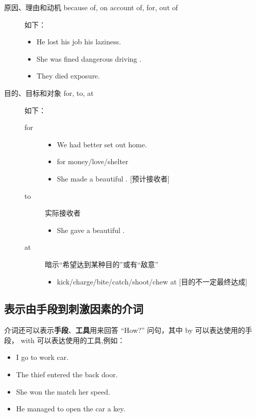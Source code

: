 \begin{description}
\item[原因、理由和动机 because of, on account of, for, out of] 如下：
  \begin{itemize}
  \item He lost his job  his laziness.
  \item She was fined  dangerous driving .
  \item They died  exposure.
  \end{itemize}

\item[目的、目标和对象 for, to, at] 如下：
  \begin{description}

  \item[for]
    \begin{itemize}
    \item We had better set out  home.

    \item for money/love/shelter

    \item She made a beautiful . [预计接收者]
    \end{itemize}

  \item[to] 实际接收者
    \begin{itemize}
    \item She gave a beautiful .
    \end{itemize}

  \item[at] 暗示“希望达到某种目的”或有“敌意”
    \begin{itemize}
    \item kick/charge/bite/catch/shoot/chew at [目的不一定最终达成]
    \end{itemize}
  \end{description}
\end{description}

\subsection{表示由手段到刺激因素的介词}

介词还可以表示\textbf{手段}、\textbf{工具}用来回答 ``How?'' 问句，其中 by 可以表达使用的手
段， with 可以表达使用的工具,例如：
\begin{itemize}
\item I go to work  car.
\item The thief entered  the back door.
\item She won the match  her speed.
\item He managed to open the car  a key.
\end{itemize}


